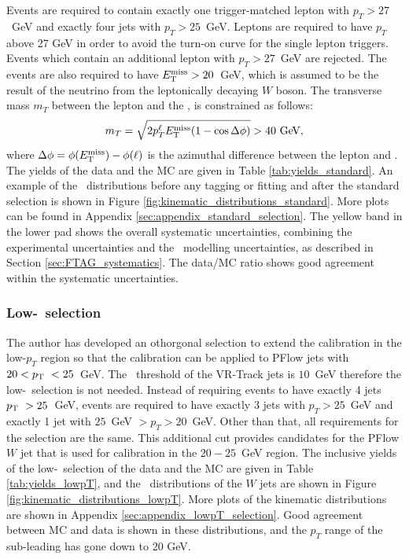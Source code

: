 \documentclass[letterpaper,12pt]{article}
\begin{document}
Events are required to contain exactly one trigger-matched 
lepton with $p_{T} > 27$~GeV and exactly four jets with 
$p_{T} > 25$~GeV. Leptons are required to have $p_{T}$ 
above 27 GeV in order to avoid the turn-on curve for the 
single lepton triggers. Events which contain an additional 
lepton with $p_T > 27$~GeV are rejected. 
The events are also required to have $E_{\mathrm T}^{\mathrm{miss}} > 20$~GeV, which is 
assumed to be the result of the neutrino from the leptonically 
decaying $W$ boson. The transverse
mass $m_T$ between the lepton and the \MET, is
constrained as follows:
\[ m_T = \sqrt{2 p_T^\ell E_{\mathrm T}^{\mathrm{miss}} (1-\cos\Delta\phi)} > 40~\text{Ge\kern -0.1em V},\]
where $\Delta\phi = \phi(E_{\mathrm T}^{\mathrm{miss}})-\phi(\ell)$ is the azimuthal difference between
the lepton and \MET.
The yields of the data and the MC are given in Table \ref{tab:yields_standard}.
An example of the \pt\ distributions
before any tagging or fitting and 
after the standard selection is shown in Figure \ref{fig:kinematic_distributions_standard}. 
More plots can be found in Appendix \ref{sec:appendix_standard_selection}.
The yellow band in the lower pad shows the overall systematic uncertainties, combining the 
experimental uncertainties and the \ttbar\ modelling uncertainties, as described in 
Section \ref{sec:FTAG_systematics}. The data/MC ratio shows good agreement 
within the systematic uncertainties. 

\subsubsection{Low-\pt\ selection}
\label{sec:lowpT_selection}
The author has developed an othorgonal selection to 
extend the calibration in the low-$p_{T}$ region so that the calibration 
can be applied to PFlow jets with $20< p_{\mathrm T}\ < 25$~GeV.
The \pt\ threshold of the VR-Track jets is $10$~GeV 
therefore the low-\pt\ selection is not needed. 
Instead of requiring events to 
have exactly 4 jets $p_{\mathrm T}\ > 25$~GeV, events are required to have exactly 3 jets with $p_{T} > 25$~GeV 
and exactly 1 jet with $25$~GeV $> p_{T} > 20$~GeV. Other than that, 
all requirements for the selection are the same. 
This additional cut provides candidates for the PFlow $W$ jet that is used 
for calibration in the $20-25$~GeV region. 
The inclusive yields of the low-\pt\ selection 
of the data and the MC are given in Table \ref{tab:yields_lowpT}, and
the \pt\ distributions of the $W$ jets are shown in Figure \ref{fig:kinematic_distributions_lowpT}.
More plots of the kinematic distributions
are shown in Appendix \ref{sec:appendix_lowpT_selection}. 
Good agreement between MC and data 
is shown in these distributions, and the $p_{T}$ range of the sub-leading has gone down to 20 GeV. 
\end{document}
